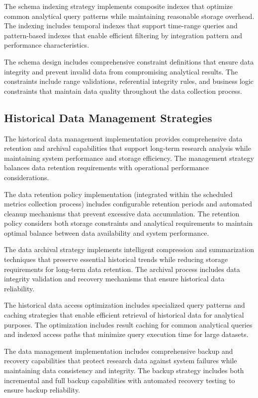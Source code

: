 The schema indexing strategy implements composite indexes that optimize common analytical query patterns while maintaining reasonable storage overhead. The indexing includes temporal indexes that support time-range queries and pattern-based indexes that enable efficient filtering by integration pattern and performance characteristics.

The schema design includes comprehensive constraint definitions that ensure data integrity and prevent invalid data from compromising analytical results. The constraints include range validations, referential integrity rules, and business logic constraints that maintain data quality throughout the data collection process.

\subsection{Historical Data Management Strategies}

The historical data management implementation provides comprehensive data retention and archival capabilities that support long-term research analysis while maintaining system performance and storage efficiency. The management strategy balances data retention requirements with operational performance considerations.

The data retention policy implementation (integrated within the scheduled metrics collection process) includes configurable retention periods and automated cleanup mechanisms that prevent excessive data accumulation. The retention policy considers both storage constraints and analytical requirements to maintain optimal balance between data availability and system performance.

The data archival strategy implements intelligent compression and summarization techniques that preserve essential historical trends while reducing storage requirements for long-term data retention. The archival process includes data integrity validation and recovery mechanisms that ensure historical data reliability.

The historical data access optimization includes specialized query patterns and caching strategies that enable efficient retrieval of historical data for analytical purposes. The optimization includes result caching for common analytical queries and indexed access paths that minimize query execution time for large datasets.

The data management implementation includes comprehensive backup and recovery capabilities that protect research data against system failures while maintaining data consistency and integrity. The backup strategy includes both incremental and full backup capabilities with automated recovery testing to ensure backup reliability.

